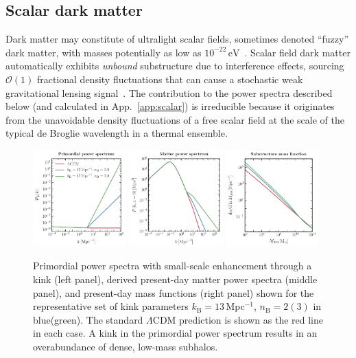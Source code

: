 \documentclass[prd,aps,twocolumn,nofootinbib,superscriptaddress,preprintnumbers,balancelastpage,longbibliography,floatfix]{revtex4-1}
\begin{document}
\subsection{Scalar dark matter}\label{sec:scalar}

Dark matter may constitute of ultralight scalar fields, sometimes denoted ``fuzzy'' dark matter, with masses potentially as low as $10^{-22}\,\mathrm{eV}$~\cite{Hu:2000ke,Hui:2016ltb}. Scalar field dark matter automatically exhibits \emph{unbound} substructure due to interference effects, sourcing $\mathcal{O}(1)$ fractional density fluctuations that can cause a stochastic weak gravitational lensing signal~\cite{Bar-Or:2018pxz,Hui:2016ltb}. 
The contribution to the power spectra described below (and calculated in App.~\ref{app:scalar}) is irreducible because it originates from the unavoidable density fluctuations of a free scalar field at the scale of the typical de Broglie wavelength in a thermal ensemble. 

\begin{figure}[!htbp]
\centering
\includegraphics[width=0.32\textwidth]{plots/primordial_kinked.pdf}
\includegraphics[width=0.32\textwidth]{plots/matterpower_kinked.pdf}
\includegraphics[width=0.32\textwidth]{plots/massfunction_kinked.pdf}
\caption{Primordial power spectra with small-scale enhancement through a kink (left panel), derived present-day matter power spectra (middle panel), and present-day mass functions (right panel) shown for the representative set of kink parameters $k_\mathrm{B}=13$\,Mpc$^{-1}$, $n_\mathrm{B}=2(3)$ in blue(green). The standard $\Lambda$CDM prediction is shown as the red line in each case. A kink in the primordial power spectrum results in an overabundance of dense, low-mass subhalos. }
\label{fig:kinked_specs}
\end{figure}
\end{document}
